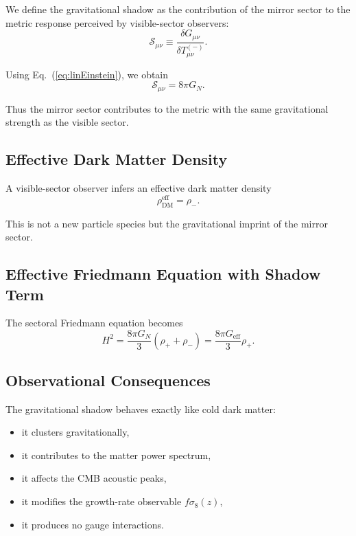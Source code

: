 \documentclass[11pt,a4paper]{article}
\begin{document}
We define the gravitational shadow as the contribution of the mirror sector to the metric response perceived by visible-sector observers:
\begin{equation}
\mathcal{S}_{\mu\nu} \equiv 
\frac{\delta G_{\mu\nu}}{\delta T_{\mu\nu}^{(-)}}.
\end{equation}

Using Eq.~(\ref{eq:linEinstein}), we obtain
\begin{equation}
\mathcal{S}_{\mu\nu} = 8\pi G_N.
\end{equation}

Thus the mirror sector contributes to the metric with the same gravitational strength as the visible sector.

\subsection{Effective Dark Matter Density}

A visible-sector observer infers an effective dark matter density
\begin{equation}
\rho_{\mathrm{DM}}^{\mathrm{eff}} = \rho_-.
\end{equation}

This is not a new particle species but the gravitational imprint of the mirror sector.

\subsection{Effective Friedmann Equation with Shadow Term}

The sectoral Friedmann equation becomes
\begin{equation}
H^2 = \frac{8\pi G_N}{3} (\rho_+ + \rho_-)
= \frac{8\pi G_{\mathrm{eff}}}{3} \rho_+.
\end{equation}

\subsection{Observational Consequences}

The gravitational shadow behaves exactly like cold dark matter:

\begin{itemize}
\item it clusters gravitationally,
\item it contributes to the matter power spectrum,
\item it affects the CMB acoustic peaks,
\item it modifies the growth-rate observable $f\sigma_8(z)$,
\item it produces no gauge interactions.
\end{itemize}
\end{document}
